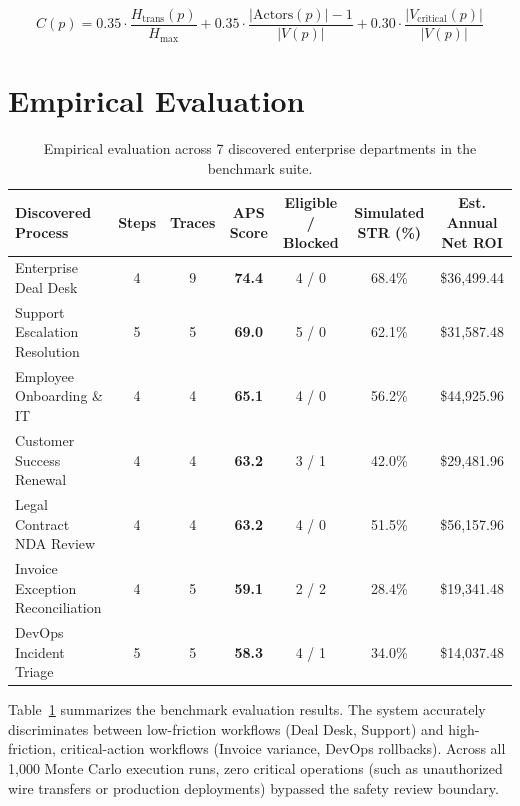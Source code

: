\documentclass[sigconf,natbib=true]{acmart}
\begin{document}
\begin{equation}
    C(p) = 0.35 \cdot \frac{H_{\text{trans}}(p)}{H_{\max}} + 0.35 \cdot \frac{|\text{Actors}(p)| - 1}{|V(p)|} + 0.30 \cdot \frac{|V_{\text{critical}}(p)|}{|V(p)|}
\end{equation}

\section{Empirical Evaluation}
\label{sec:evaluation}

\begin{table}[t]
\centering
\caption{Empirical evaluation across 7 discovered enterprise departments in the benchmark suite.}
\label{tab:evaluation}
\begin{tabular}{lcccccc}
\toprule
\textbf{Discovered Process} & \textbf{Steps} & \textbf{Traces} & \textbf{APS Score} & \textbf{Eligible / Blocked} & \textbf{Simulated STR (\%)} & \textbf{Est. Annual Net ROI} \\
\midrule
Enterprise Deal Desk & 4 & 9 & \textbf{74.4} & 4 / 0 & 68.4\% & \$36,499.44 \\
Support Escalation Resolution & 5 & 5 & \textbf{69.0} & 5 / 0 & 62.1\% & \$31,587.48 \\
Employee Onboarding \& IT & 4 & 4 & \textbf{65.1} & 4 / 0 & 56.2\% & \$44,925.96 \\
Customer Success Renewal & 4 & 4 & \textbf{63.2} & 3 / 1 & 42.0\% & \$29,481.96 \\
Legal Contract NDA Review & 4 & 4 & \textbf{63.2} & 4 / 0 & 51.5\% & \$56,157.96 \\
Invoice Exception Reconciliation & 4 & 5 & \textbf{59.1} & 2 / 2 & 28.4\% & \$19,341.48 \\
DevOps Incident Triage & 5 & 5 & \textbf{58.3} & 4 / 1 & 34.0\% & \$14,037.48 \\
\bottomrule
\end{tabular}
\end{table}

Table~\ref{tab:evaluation} summarizes the benchmark evaluation results. The system accurately discriminates between low-friction workflows (Deal Desk, Support) and high-friction, critical-action workflows (Invoice variance, DevOps rollbacks). Across all 1,000 Monte Carlo execution runs, zero critical operations (such as unauthorized wire transfers or production deployments) bypassed the safety review boundary.
\end{document}
